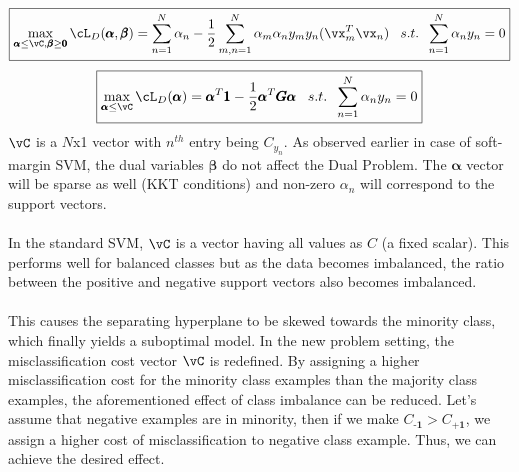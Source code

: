 \documentclass[a4paper,11pt]{article}
\begin{document}
\begin{mlsolution}
\[
    \boxed{\max\limits_{\pmb{\alpha}\leq\vC, \pmb{\beta}\geq\pmb{0}} \cL_D(\pmb{\alpha}, \pmb{\beta}) = \sum\limits_{n=1}^N\alpha_n - \frac{1}{2}\sum\limits_{m,n=1}^N\alpha_m\alpha_ny_my_n(\vx_m^T\vx_n) \;\;\; s.t. \;\; \sum\limits_{n=1}^N\alpha_ny_n=0}
\]
\[
    \boxed{\max\limits_{\pmb{\alpha}\leq\vC} \cL_D(\pmb{\alpha}) = \pmb{\alpha}^T\pmb{1} - \frac{1}{2}\pmb{\alpha}^T\pmb{G\alpha} \;\;\; s.t. \;\; \sum\limits_{n=1}^N\alpha_ny_n=0}
\]
$\vC$ is a $N$x1 vector with $n^{th}$ entry being $C_{y_n}$. As observed earlier in case of soft-margin SVM, the dual variables $\pmb{\beta}$ do not affect the Dual Problem. The $\pmb{\alpha}$ vector will be sparse as well (KKT conditions) and non-zero $\alpha_n$ will correspond to the support vectors. \\ \\
In the standard SVM, $\vC$ is a vector having all values as $C$ (a fixed scalar). This performs well for balanced classes but as the data becomes imbalanced, the ratio between the positive and negative support vectors also becomes imbalanced.\\ \\
This causes the separating hyperplane to be skewed towards the minority class, which finally yields a suboptimal model. In the new problem setting, the misclassification cost vector $\vC$ is redefined. By assigning a higher misclassification cost for the minority class examples than the majority class examples, the aforementioned effect of class imbalance can be reduced.
Let's assume that negative examples are in minority, then if we make $C_{\textbf{-1}} > C_{\textbf{+1}}$, we assign a higher cost of misclassification to negative class example. Thus, we can achieve the desired effect.

\end{mlsolution}
\end{document}
